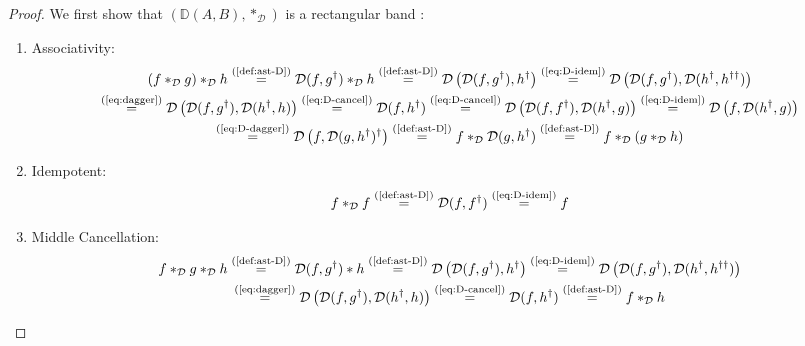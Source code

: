 \documentclass[10pt]{article}
\begin{document}
\begin{proof} We first show that $(\mathbb{D}(A,B),\ast_\mathcal{D})$ is a rectangular band :
\begin{enumerate}[{\em (i)}]
\item Associativity:
\begin{gather*}
    (f \ast_\mathcal{D} g) \ast_\mathcal{D} h \overset{\text{(\ref{def:ast-D})}}{=} \mathcal{D}( f, g^\dagger ) \ast_\mathcal{D} h \overset{\text{(\ref{def:ast-D})}}{=} \mathcal{D}\left( \mathcal{D}( f, g^\dagger), h^\dagger \right) \overset{\text{(\ref{eq:D-idem})}}{=} \mathcal{D}\left( \mathcal{D}( f, g^\dagger), \mathcal{D}(h^\dagger, h^{\dagger\dagger}) \right) \\ \overset{\text{(\ref{eq:dagger})}}{=} \mathcal{D}\left( \mathcal{D}( f, g^\dagger), \mathcal{D}(h^\dagger, h) \right)
    \overset{\text{(\ref{eq:D-cancel})}}{=} \mathcal{D}(f,h^\dagger) \overset{\text{(\ref{eq:D-cancel})}}{=} \mathcal{D}\left( \mathcal{D}( f, f^\dagger), \mathcal{D}(h^\dagger, g) \right) \overset{\text{(\ref{eq:D-idem})}}{=}  \mathcal{D}\left( f, \mathcal{D}(h^\dagger, g) \right) \\ \overset{\text{(\ref{eq:D-dagger})}}{=}  \mathcal{D}\left(f, \mathcal{D}(g,h^\dagger)^\dagger \right) \overset{\text{(\ref{def:ast-D})}}{=} f \ast_\mathcal{D} \mathcal{D}(g,h^\dagger)  \overset{\text{(\ref{def:ast-D})}}{=} f \ast_\mathcal{D} (g \ast_\mathcal{D} h)  
\end{gather*}
\item Idempotent: 
\begin{align*}
    f \ast_\mathcal{D}  f \overset{\text{(\ref{def:ast-D})}}{=} \mathcal{D}( f, f^\dagger ) \overset{\text{(\ref{eq:D-idem})}}{=} f
\end{align*}
\item Middle Cancellation: 
\begin{gather*}
f \ast_\mathcal{D} g \ast_\mathcal{D} h \overset{\text{(\ref{def:ast-D})}}{=} \mathcal{D}( f, g^\dagger ) \ast h \overset{\text{(\ref{def:ast-D})}}{=} \mathcal{D}\left( \mathcal{D}( f, g^\dagger), h^\dagger \right) \overset{\text{(\ref{eq:D-idem})}}{=} \mathcal{D}\left( \mathcal{D}( f, g^\dagger), \mathcal{D}(h^\dagger, h^{\dagger\dagger}) \right) \\\overset{\text{(\ref{eq:dagger})}}{=} \mathcal{D}\left( \mathcal{D}( f, g^\dagger), \mathcal{D}(h^\dagger, h) \right) \overset{\text{(\ref{eq:D-cancel})}}{=} \mathcal{D}(f,h^\dagger) \overset{\text{(\ref{def:ast-D})}}{=} f \ast_\mathcal{D} h
\end{gather*}

\end{enumerate}
\end{proof}
\end{document}
